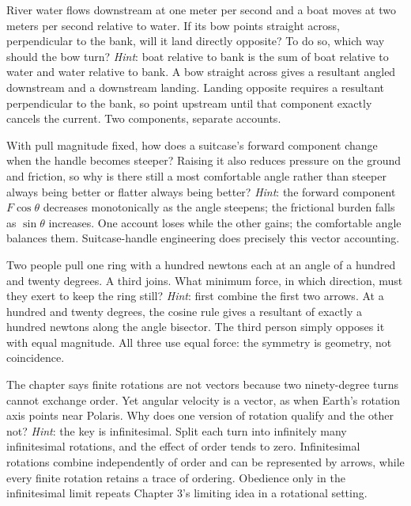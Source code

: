 \begin{puzzles}
\item River water flows downstream at one meter per second and a boat moves at two meters per second relative to water. If its bow points straight across, perpendicular to the bank, will it land directly opposite? To do so, which way should the bow turn? \emph{Hint}: boat relative to bank is the sum of boat relative to water and water relative to bank. A bow straight across gives a resultant angled downstream and a downstream landing. Landing opposite requires a resultant perpendicular to the bank, so point upstream until that component exactly cancels the current. Two components, separate accounts.
\item With pull magnitude fixed, how does a suitcase's forward component change when the handle becomes steeper? Raising it also reduces pressure on the ground and friction, so why is there still a most comfortable angle rather than steeper always being better or flatter always being better? \emph{Hint}: the forward component \(F\cos\theta\) decreases monotonically as the angle steepens; the frictional burden falls as \(\sin\theta\) increases. One account loses while the other gains; the comfortable angle balances them. Suitcase-handle engineering does precisely this vector accounting.
\item Two people pull one ring with a hundred newtons each at an angle of a hundred and twenty degrees. A third joins. What minimum force, in which direction, must they exert to keep the ring still? \emph{Hint}: first combine the first two arrows. At a hundred and twenty degrees, the cosine rule gives a resultant of exactly a hundred newtons along the angle bisector. The third person simply opposes it with equal magnitude. All three use equal force: the symmetry is geometry, not coincidence.
\item The chapter says finite rotations are not vectors because two ninety-degree turns cannot exchange order. Yet angular velocity is a vector, as when Earth's rotation axis points near Polaris. Why does one version of rotation qualify and the other not? \emph{Hint}: the key is infinitesimal. Split each turn into infinitely many infinitesimal rotations, and the effect of order tends to zero. Infinitesimal rotations combine independently of order and can be represented by arrows, while every finite rotation retains a trace of ordering. Obedience only in the infinitesimal limit repeats Chapter 3's limiting idea in a rotational setting.
\end{puzzles}
